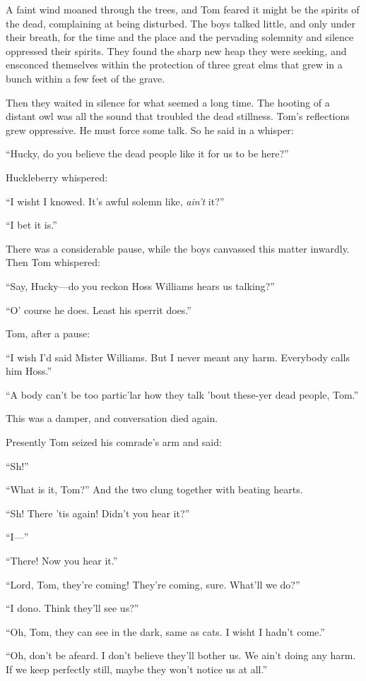 \documentclass{book}
\begin{document}
A faint wind moaned through the trees, and Tom feared it might be the spirits of the dead, complaining at being disturbed. The boys talked little, and only under their breath, for the time and the place and the pervading solemnity and silence oppressed their spirits. They found the sharp new heap they were seeking, and ensconced themselves within the protection of three great elms that grew in a bunch within a few feet of the grave.

Then they waited in silence for what seemed a long time. The hooting of a distant owl was all the sound that troubled the dead stillness. Tom’s reflections grew oppressive. He must force some talk. So he said in a whisper:

“Hucky, do you believe the dead people like it for us to be here?”

Huckleberry whispered:

“I wisht I knowed. It’s awful solemn like, \emph{ain’t} it?”

“I bet it is.”

There was a considerable pause, while the boys canvassed this matter inwardly. Then Tom whispered:

“Say, Hucky—do you reckon Hoss Williams hears us talking?”

“O’ course he does. Least his sperrit does.”

Tom, after a pause:

“I wish I’d said Mister Williams. But I never meant any harm. Everybody calls him Hoss.”

“A body can’t be too partic’lar how they talk ’bout these-yer dead people, Tom.”

This was a damper, and conversation died again.

Presently Tom seized his comrade’s arm and said:

“Sh!”

“What is it, Tom?” And the two clung together with beating hearts.

“Sh! There ’tis again! Didn’t you hear it?”

“I—”

“There! Now you hear it.”

“Lord, Tom, they’re coming! They’re coming, sure. What’ll we do?”

“I dono. Think they’ll see us?”

“Oh, Tom, they can see in the dark, same as cats. I wisht I hadn’t come.”

“Oh, don’t be afeard. I don’t believe they’ll bother us. We ain’t doing any harm. If we keep perfectly still, maybe they won’t notice us at all.”
\end{document}
